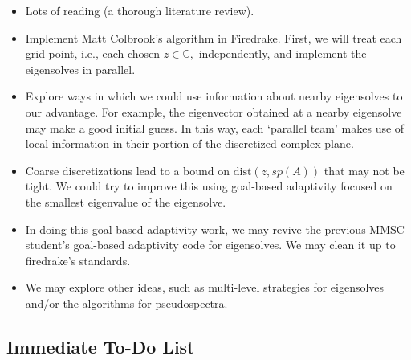 \documentclass[12pt,a4paper]{article}
\begin{document}
\begin{itemize}
    \item Lots of reading (a thorough literature review).
    \item Implement Matt Colbrook's algorithm in Firedrake. First, we will treat each grid point, i.e., each chosen $z \in \mathbb{C},$ independently, and implement the eigensolves in parallel.
    \item Explore ways in which we could use information about nearby eigensolves to our advantage. For example, the eigenvector obtained at a nearby eigensolve may make a good initial guess. In this way, each `parallel team' makes use of local information in their portion of the discretized complex plane. 
    \item Coarse discretizations lead to a bound on $\text{dist}(z, sp(A))$ that may not be tight. We could try to improve this using goal-based adaptivity focused on the smallest eigenvalue of the eigensolve.
    \item In doing this goal-based adaptivity work, we may revive the previous MMSC student's goal-based adaptivity code for eigensolves. We may clean it up to firedrake's standards. 
    \item We may explore other ideas, such as multi-level strategies for eigensolves and/or the algorithms for pseudospectra. 
\end{itemize}

\subsection{Immediate To-Do List}
\end{document}
